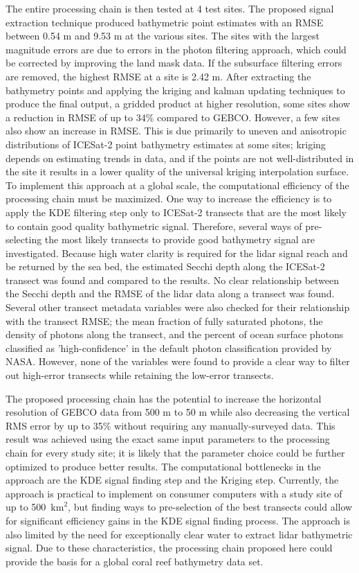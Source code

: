 The entire processing chain is then tested at 4 test sites. The proposed signal extraction technique produced bathymetric point estimates with an RMSE between 0.54 m and 9.53 m at the various sites. The sites with the largest magnitude errors are due to errors in the photon filtering approach, which could be corrected by improving the land mask data. If the subsurface filtering errors are removed, the highest RMSE at a site is 2.42 m. After extracting the bathymetry points and applying the kriging and kalman updating techniques to produce the final output, a gridded product at higher resolution, some sites show a reduction in RMSE of up to 34\% compared to GEBCO. However, a few sites also show an increase in RMSE. This is due primarily to uneven and anisotropic distributions of ICESat-2 point bathymetry estimates at some sites; kriging depends on estimating trends in data, and if the points are not well-distributed in the site it results in a lower quality of the universal kriging interpolation surface.
\vskip 0.1in
To implement this approach at a global scale, the computational efficiency of the processing chain must be maximized. One way to increase the efficiency is to apply the KDE filtering step only to ICESat-2 transects that are the most likely to contain good quality bathymetric signal. Therefore, several ways of pre-selecting the most likely transects to provide good bathymetry signal are investigated. Because high water clarity is required for the lidar signal reach and be returned by the sea bed, the estimated Secchi depth along the ICESat-2 transect was found and compared to the results. No clear relationship between the Secchi depth and the RMSE of the lidar data along a transect was found. Several other transect metadata variables were also checked for their relationship with the transect RMSE; the mean fraction of fully saturated photons, the density of photons along the transect, and the percent of ocean surface photons classified as 'high-confidence' in the default photon classification provided by NASA. However, none of the variables were found to provide a clear way to filter out high-error transects while retaining the low-error transects.
\vskip 0.1in

The proposed processing chain has the potential to increase the horizontal resolution of GEBCO data from 500 m to 50 m while also decreasing the vertical RMS error by up to 35\% without requiring any manually-surveyed data. This result was achieved using the exact same input parameters to the processing chain for every study site; it is likely that the parameter choice could be further optimized to produce better results. The computational bottlenecks in the approach are the KDE signal finding step and the Kriging step. Currently, the approach is practical to implement on consumer computers with a study site of up to 500~$\text{km}^2$, but finding ways to pre-selection of the best transects could allow for significant efficiency gains in the KDE signal finding process. The approach is also limited by the need for exceptionally clear water to extract lidar bathymetric signal. Due to these characteristics, the processing chain proposed here could provide the basis for a global coral reef bathymetry data set.
